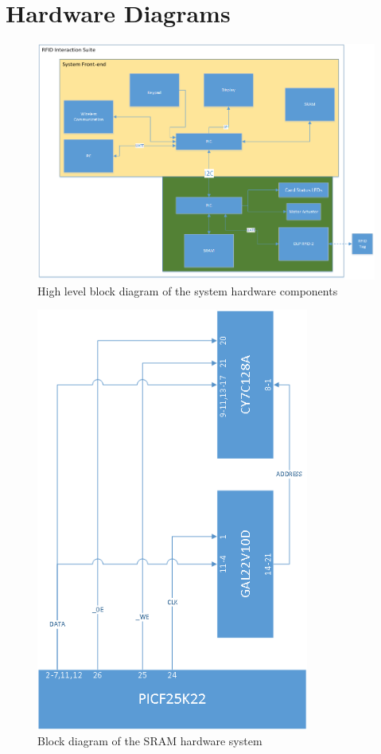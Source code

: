 \documentclass[12pt]{article} %
\begin{document}
\pagebreak

\section{Hardware Diagrams\label{appendix:hwDiagrams}}
\begin{figure}[H]
	\centering
	\includegraphics[width=\textwidth]{images/BlockDiagram.png}
	\caption{High level block diagram of the system hardware components}
	\label{fig:highLevelBlockDiagram}
\end{figure}

\begin{figure}[H]
	\centering
	\includegraphics[width=0.8\textwidth]{images/SRAMHardwareBlock.png}
	\caption{Block diagram of the SRAM hardware system}
	\label{fig:sramBlockDiagram}
\end{figure}
\end{document}
